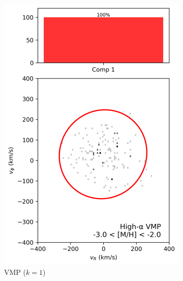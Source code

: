 \documentclass[a4paper,12pt]{article}
\begin{document}
\begin{figure}[ht]
  \centering

  \begin{subfigure}{0.245\linewidth}
    \includegraphics[width=\linewidth]{../figures/gmm_vmp_high_alpha_k1.png}
    \caption{VMP ($k{=}1$)}
    \label{fig:vmp_hi}
  \end{subfigure}\hfill
  \begin{subfigure}{0.245\linewidth}

\end{subfigure}
\end{figure}
\end{document}
